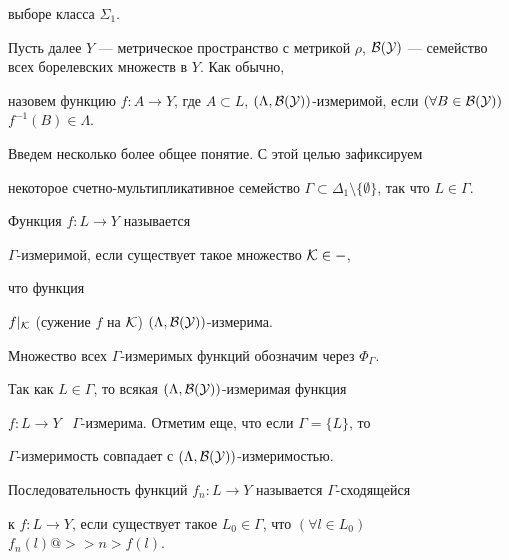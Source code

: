выборе класса $\Sigma_1$. 


 


Пусть далее $Y$ --- метрическое пространство с метрикой $\rho$, $\cal 


B(Y)$ --- семейство всех борелевских множеств в $Y$. Как обычно, 


назовем функцию $f:A\to Y$, где $A\subset L$, $(\Lambda,\cal 


B(Y))$-измеримой, если $(\forall B\in\cal B(Y))$ $f^{-1}(B)\in\Lambda$. 


 


Введем несколько более общее понятие. С этой целью зафиксируем 


некоторое счетно-мультипликативное семейство $\Gamma\subset 


\Delta_1\setminus\{\emptyset\}$, так что $L\in\Gamma$. 


 


 


\begin{defns} 


Функция $f:L\to Y$ называется 


$\Gamma$-измеримой, если существует такое множество $\cal K\in\Gamma$, 


что функция 


$f|_{\cal K}$ (сужение $f$ на $\cal K$) $(\Lambda,\cal B(Y))$-измерима. 


\end{defns} 


 


Множество всех $\Gamma$-измеримых функций обозначим через $\Phi_\Gamma$. 


 


Так как $L\in\Gamma$, то всякая $(\Lambda,\cal B(Y))$-измеримая функция 


$f:L\to Y$ \ $\Gamma$-измерима. Отметим еще, что если $\Gamma=\{L\}$, то 


$\Gamma$-измеримость совпадает с $(\Lambda,\cal B(Y))$-измеримостью. 


 


\begin{defns} 


Последовательность функций $f_n:L\to Y$ называется $\Gamma$-сходящейся 


к $f:L\to Y$, если существует такое $L_0\in\Gamma$, что $(\forall l\in 


L_0)$ $f_n(l)@>>n>f(l)$. 


\end{defns} 


